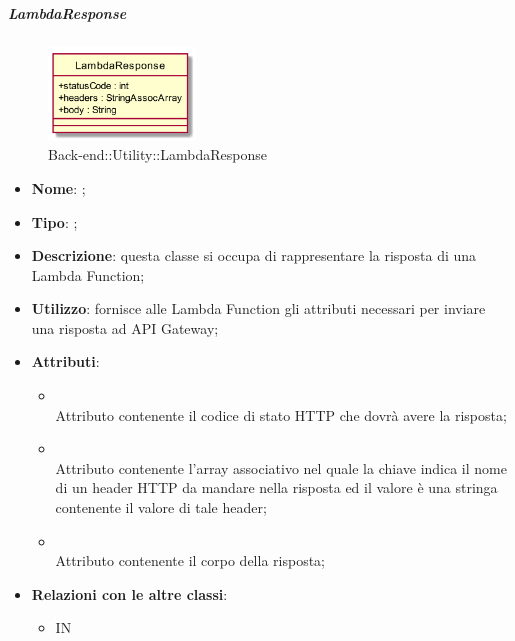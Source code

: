 \hypertarget{LambdaResponse_label}{\subparagraph{LambdaResponse}}
\begin{figure}[h]
	\centering
	\includegraphics[width=0.35\textwidth,height=\textheight,keepaspectratio]{images/ClassLambdaResponse.png}
	\caption{Back-end::Utility::LambdaResponse}
\end{figure}
\begin{itemize}
	\item \textbf{Nome}: ;
	\item \textbf{Tipo}: ;
	\item \textbf{Descrizione}: questa classe si occupa di rappresentare la risposta di una Lambda Function;
	\item \textbf{Utilizzo}: fornisce alle Lambda Function gli attributi necessari per inviare una risposta ad API Gateway;
	\item \textbf{Attributi}:
	\begin{itemize}
		\item[]  \\
		Attributo contenente il codice di stato HTTP che dovrà avere la risposta;
		\item[]  \\
		Attributo contenente l'array associativo nel quale la chiave indica il nome di un header HTTP da mandare nella risposta ed il valore è una stringa contenente il valore di tale header;
		\item[]  \\
		Attributo contenente il corpo della risposta;
	\end{itemize}
	\item \textbf{Relazioni con le altre classi}:
	\begin{itemize}
		\item IN \hyperlink{LambdaContext_label}{}
	\end{itemize}
\end{itemize}
\FloatBarrier

